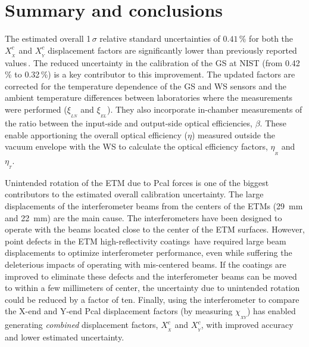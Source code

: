 \documentclass[12pt,a4paper,final]{iopart}
\begin{document}
\section{Summary and conclusions}
\label{sec:Conc}
%
The estimated overall 1\,$\sigma$ relative standard uncertainties of $0.41\,\%$ 
for both the $X^{c}_{_X}$ and $X^{c}_{_Y}$ displacement factors are significantly lower than previously reported values\,\cite{P1900127}.  The reduced uncertainty in the calibration of the GS at NIST (from 0.42\,\% to 0.32\,\%) is a key contributor to this improvement.  The updated factors are corrected for the temperature dependence of the GS and WS sensors and the ambient temperature differences between laboratories where the measurements were performed ($\xi_{_{LN}}$ and $\xi_{_{EL}}$).  They also incorporate in-chamber measurements of the ratio between the input-side and output-side 
optical efficiencies, $\beta$.  These enable apportioning the overall optical efficiency ($\eta$) measured outside 
the vacuum envelope with the WS to calculate the optical efficiency factors, $\eta_{_R}$ and 
$\eta_{_T}$. 

Unintended rotation of the ETM due to Pcal forces is one of the biggest contributors to the estimated overall calibration uncertainty.    The large displacements of the interferometer beams from the centers of the ETMs (29~mm and 22~mm) are the main cause.  The interferometers have been designed to operate with the beams located close to the center of the ETM surfaces.  However, point defects in the ETM high-reflectivity coatings\,\cite{pointDefects} have required large beam displacements to optimize interferometer performance, even while suffering the deleterious impacts of operating with mis-centered beams.  
If the coatings are improved to eliminate these defects and the interferometer beams can be moved to within a few millimeters of center, the uncertainty due to unintended rotation could be reduced by a factor of ten.  
Finally, using the interferometer to compare the X-end and Y-end Pcal displacement factors (by measuring $\chi_{_{XY}}$) has enabled generating {\em combined} displacement factors, $X^c_{_X}$ and $X^c_{_Y}$, with improved accuracy and lower estimated uncertainty.
\end{document}
